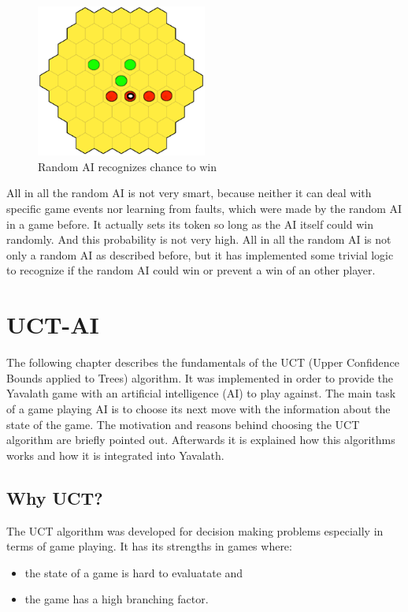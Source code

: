 \documentclass[english]{report}
\begin{document}
\begin{figure}[ht]
\centering
\includegraphics[width=0.5\textwidth]{Abbildungen/randomAI3.png}
\caption{Random AI recognizes chance to win }
\label{fig:randomAI3}
\end{figure}
All in all the random AI is not very smart, because neither it can deal with specific 
game events nor learning from faults, which were made by the random AI in a game before. It actually sets its token so long as the AI itself could win randomly. 
And this probability is not very high. All in all the random AI is not only a random AI as described before, but it has implemented some trivial logic to recognize if the random AI could win or prevent a win of an other player.


\section{UCT-AI}
\label{sec:chapter4}
The following chapter describes the fundamentals of the UCT (Upper Confidence
Bounds applied to Trees) algorithm. It was implemented in order to provide the
Yavalath game with an artificial intelligence (AI) to play against. The main
task of a game playing AI is to choose its next move with the information about
the state of the game. The motivation and reasons behind choosing the UCT
algorithm are briefly pointed out. Afterwards it is explained how this
algorithms works and how it is integrated into Yavalath.

\subsection{Why UCT?}
The UCT algorithm was developed for decision making problems especially in terms
of game playing. It has its strengths in games where:
\begin{itemize}
	\item the state of a game is hard to evaluatate and
	\item the game has a high branching factor.\cite{wiki:mcts}
\end{itemize}
\end{document}
